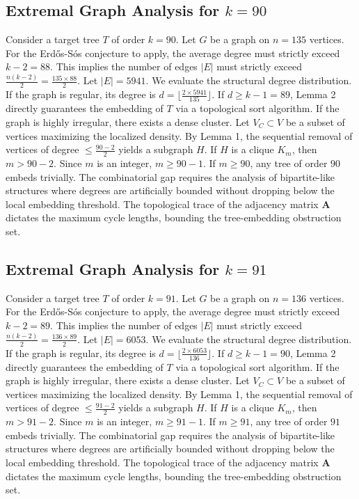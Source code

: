 \documentclass[11pt,a4paper]{article}
\begin{document}
\subsection{Extremal Graph Analysis for $k=90$}
Consider a target tree $T$ of order $k=90$.
Let $G$ be a graph on $n=135$ vertices.
For the Erd\H{o}s-S\'os conjecture to apply, the average degree must strictly exceed $k-2 = 88$.
This implies the number of edges $|E|$ must strictly exceed $\frac{n(k-2)}{2} = \frac{135 \times 88}{2}$.
Let $|E| = 5941$.
We evaluate the structural degree distribution. If the graph is regular, its degree is $d = \lfloor \frac{2 \times 5941}{135} \rfloor$.
If $d \geq k-1 = 89$, Lemma 2 directly guarantees the embedding of $T$ via a topological sort algorithm.
If the graph is highly irregular, there exists a dense cluster. Let $V_C \subset V$ be a subset of vertices maximizing the localized density.
By Lemma 1, the sequential removal of vertices of degree $\leq \frac{90-2}{2}$ yields a subgraph $H$.
If $H$ is a clique $K_{m}$, then $m > 90-2$. Since $m$ is an integer, $m \geq 90-1$. If $m \geq 90$, any tree of order $90$ embeds trivially.
The combinatorial gap requires the analysis of bipartite-like structures where degrees are artificially bounded without dropping below the local embedding threshold. The topological trace of the adjacency matrix $\mathbf{A}$ dictates the maximum cycle lengths, bounding the tree-embedding obstruction set.


\subsection{Extremal Graph Analysis for $k=91$}
Consider a target tree $T$ of order $k=91$.
Let $G$ be a graph on $n=136$ vertices.
For the Erd\H{o}s-S\'os conjecture to apply, the average degree must strictly exceed $k-2 = 89$.
This implies the number of edges $|E|$ must strictly exceed $\frac{n(k-2)}{2} = \frac{136 \times 89}{2}$.
Let $|E| = 6053$.
We evaluate the structural degree distribution. If the graph is regular, its degree is $d = \lfloor \frac{2 \times 6053}{136} \rfloor$.
If $d \geq k-1 = 90$, Lemma 2 directly guarantees the embedding of $T$ via a topological sort algorithm.
If the graph is highly irregular, there exists a dense cluster. Let $V_C \subset V$ be a subset of vertices maximizing the localized density.
By Lemma 1, the sequential removal of vertices of degree $\leq \frac{91-2}{2}$ yields a subgraph $H$.
If $H$ is a clique $K_{m}$, then $m > 91-2$. Since $m$ is an integer, $m \geq 91-1$. If $m \geq 91$, any tree of order $91$ embeds trivially.
The combinatorial gap requires the analysis of bipartite-like structures where degrees are artificially bounded without dropping below the local embedding threshold. The topological trace of the adjacency matrix $\mathbf{A}$ dictates the maximum cycle lengths, bounding the tree-embedding obstruction set.
\end{document}

